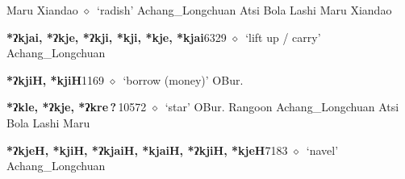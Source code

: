 \begin{list}{}{\leftmargin=1.5em \itemindent=-1.5em}
         Maru 
\hspace{1ex}
         Xiandao 
\hspace{1ex}
         $\diamond$~`radish'
         Achang\_Longchuan 
\hspace{1ex}
         Atsi 
\hspace{1ex}
         Bola 
\hspace{1ex}
         Lashi 
\hspace{1ex}
         Maru 
\hspace{1ex}
         Xiandao 
  \item {\footnotesize \textbf{*ʔkjai, *ʔkje, *ʔkji, *kji, *kje, *kjai}}{\tiny 6329}
\hspace{1ex}
         $\diamond$~`lift up / carry'
         Achang\_Longchuan 
  \item {\footnotesize \textbf{*ʔkjiH, *kjiH}}{\tiny 1169}
\hspace{1ex}
         $\diamond$~`borrow (money)'
         OBur. 
  \item {\footnotesize \textbf{*ʔkle, *ʔkje, *ʔkre\,?\,}}{\tiny 10572}
\hspace{1ex}
         $\diamond$~`star'
         OBur. 
\hspace{1ex}
         Rangoon 
\hspace{1ex}
         Achang\_Longchuan 
\hspace{1ex}
         Atsi 
\hspace{1ex}
         Bola 
\hspace{1ex}
         Lashi 
\hspace{1ex}
         Maru 
  \item {\footnotesize \textbf{*ʔkjeH, *kjiH, *ʔkjaiH, *kjaiH, *ʔkjiH, *kjeH}}{\tiny 7183}
\hspace{1ex}
         $\diamond$~`navel'
         Achang\_Longchuan 

\end{list}
